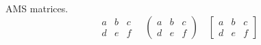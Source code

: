 \documentclass{article}
\begin{document}
AMS matrices.
\[
\begin{matrix}
a & b & c \\
d & e & f
\end{matrix}
\quad
\begin{pmatrix}
a & b & c \\
d & e & f
\end{pmatrix}
\quad
\begin{bmatrix}
a & b & c \\
d & e & f
\end{bmatrix}
\]
\end{document}
